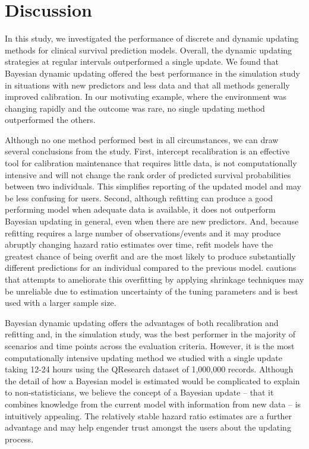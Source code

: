 \documentclass[]{article}
\begin{document}
 
 

\begin{table}
		\small
	
	
\end{table}



\section{Discussion}


In this study, we investigated the performance of discrete and dynamic updating methods for clinical survival prediction models. Overall, the dynamic updating strategies at regular intervals outperformed a single update. We found that Bayesian dynamic updating offered the best performance in the simulation study in situations with new predictors and less data and that all methods generally improved calibration. In our motivating example, where the environment was changing rapidly and the outcome was rare, no single updating method outperformed the others. 


Although no one method performed best in all circumstances, we can draw several conclusions from the study. First, intercept recalibration is an effective tool for calibration maintenance that requires little data, is not computationally intensive and will not change the rank order of predicted survival probabilities between two individuals. This simplifies reporting of the updated model and may be less confusing for users.  Second, although refitting can produce a good performing model when adequate data is available, it does not outperform Bayesian updating in general, even when there are new predictors.  And, because refitting requires a large number of observations/events and it may produce abruptly changing hazard ratio estimates over time, refit models have the greatest chance of being overfit and are the most likely to produce substantially different predictions for an individual compared to the previous model. \citet{Riley2021} cautions that attempts to ameliorate this overfitting by applying shrinkage techniques may be unreliable due to estimation uncertainty of the tuning parameters and is best used with a larger sample size.


Bayesian dynamic updating offers the advantages of both recalibration and refitting and, in the simulation study, was the best performer in the majority of scenarios and time points across the evaluation criteria. However, it is the most computationally intensive updating method we studied with a single update taking 12-24 hours using the QResearch dataset of 1,000,000 records. Although the detail of how a Bayesian model is estimated would be complicated to explain to non-statisticians, we believe the concept of a Bayesian update -- that it combines knowledge from the current model with information from new data -- is intuitively appealing. The relatively stable hazard ratio estimates are a further advantage and may help engender trust amongst the users about the updating process. 
\end{document}
